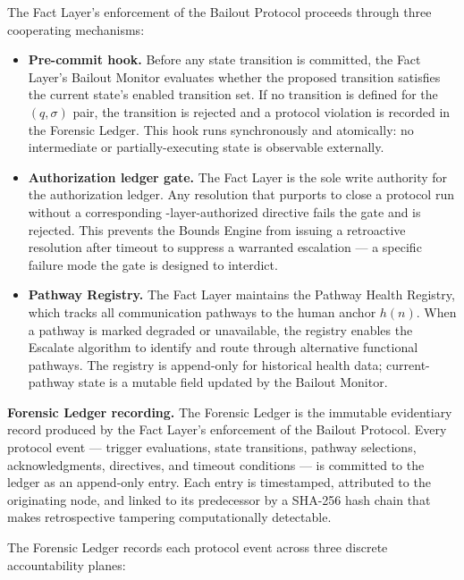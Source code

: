 The Fact Layer's enforcement of the Bailout Protocol proceeds through three cooperating mechanisms:

\begin{itemize}\itemsep=0pt
\item[(\textit{i})] \textbf{Pre-commit hook.} Before any state transition is committed, the Fact Layer's Bailout Monitor evaluates whether the proposed transition satisfies the current state's enabled transition set. If no transition is defined for the $(q, \sigma)$ pair, the transition is rejected and a protocol violation is recorded in the Forensic Ledger. This hook runs synchronously and atomically: no intermediate or partially-executing state is observable externally.

\item[(\textit{ii})] \textbf{Authorization ledger gate.} The Fact Layer is the sole write authority for the authorization ledger. Any resolution that purports to close a protocol run without a corresponding \purpose-layer-authorized directive fails the gate and is rejected. This prevents the Bounds Engine from issuing a retroactive resolution after timeout to suppress a warranted escalation — a specific failure mode the gate is designed to interdict.

\item[(\textit{iii})] \textbf{Pathway Registry.} The Fact Layer maintains the Pathway Health Registry, which tracks all communication pathways to the human anchor $h(n)$. When a pathway is marked degraded or unavailable, the registry enables the Escalate algorithm to identify and route through alternative functional pathways. The registry is append-only for historical health data; current-pathway state is a mutable field updated by the Bailout Monitor.
\end{itemize}

\bigskip
\noindent\textbf{Forensic Ledger recording.} The Forensic Ledger is the immutable evidentiary record produced by the Fact Layer's enforcement of the Bailout Protocol. Every protocol event — trigger evaluations, state transitions, pathway selections, acknowledgments, directives, and timeout conditions — is committed to the ledger as an append-only entry. Each entry is timestamped, attributed to the originating node, and linked to its predecessor by a SHA-256 hash chain that makes retrospective tampering computationally detectable.

The Forensic Ledger records each protocol event across three discrete accountability planes:

